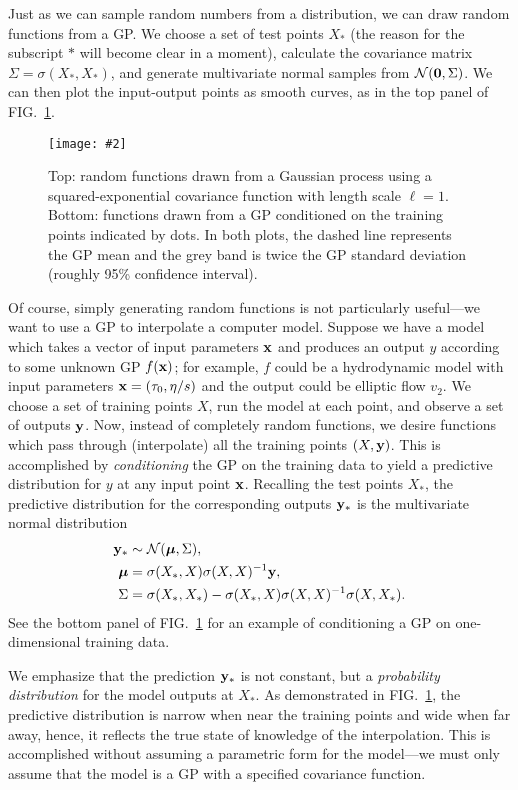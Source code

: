 \documentclass[aps,prc,reprint,amsmath]{revtex4-1}
\newcommand{\colfig}[3][t]{
  \begin{figure}[#1]
    \texttt{[image: \#2]}
    \caption{\label{fig:#2}#3}
  \end{figure}
}
\begin{document}
Just as we can sample random numbers from a distribution, we can draw random functions from a GP.
We choose a set of test points $X_*$ (the reason for the subscript $*$ will become clear in a moment), calculate the covariance matrix $\Sigma = \sigma(X_*, X_*)$, and generate multivariate normal samples from $\mathcal N(\mathbf 0, \Sigma)$.
We can then plot the input-output points as smooth curves, as in the top panel of FIG.~\ref{fig:gp}.

\colfig{gp}{
  Top: random functions drawn from a Gaussian process using a squared-exponential covariance function with length scale $\ell = 1$.
  Bottom: functions drawn from a GP conditioned on the training points indicated by dots.
  In both plots, the dashed line represents the GP mean and the grey band is twice the GP standard deviation (roughly 95\% confidence interval).
}

Of course, simply generating random functions is not particularly useful---we want to use a GP to interpolate a computer model.
Suppose we have a model which takes a vector of input parameters $\mathbf x$ and produces an output $y$ according to some unknown GP $f(\mathbf x)$; for example, $f$ could be a hydrodynamic model with input parameters $\mathbf x = (\tau_0, \eta/s)$ and the output could be elliptic flow $v_2$.
We choose a set of training points $X$, run the model at each point, and observe a set of outputs $\mathbf y$.
Now, instead of completely random functions, we desire functions which pass through (interpolate) all the training points $(X, \mathbf y)$.
This is accomplished by \emph{conditioning} the GP on the training data to yield a predictive distribution for $y$ at any input point $\mathbf x$.
Recalling the test points $X_*$, the predictive distribution for the corresponding outputs $\mathbf y_*$ is the multivariate normal distribution
\begin{equation}
  \begin{aligned}
    \mathbf y_* &\sim \mathcal N(\boldsymbol\mu, \Sigma), \\
    \boldsymbol\mu &= \sigma(X_*, X)\sigma(X, X)^{-1}\mathbf y, \\
    \Sigma &= \sigma(X_*,X_*) - \sigma(X_*,X)\sigma(X,X)^{-1}\sigma(X,X_*).
  \end{aligned}
  \label{eq:cond}
\end{equation}
See the bottom panel of FIG.~\ref{fig:gp} for an example of conditioning a GP on one-dimensional training data.

We emphasize that the prediction $\mathbf y_*$ is not constant, but a \emph{probability distribution} for the model outputs at $X_*$.
As demonstrated in FIG.~\ref{fig:gp}, the predictive distribution is narrow when near the training points and wide when far away, hence, it reflects the true state of knowledge of the interpolation.
This is accomplished without assuming a parametric form for the model---we must only assume that the model is a GP with a specified covariance function.
\end{document}
